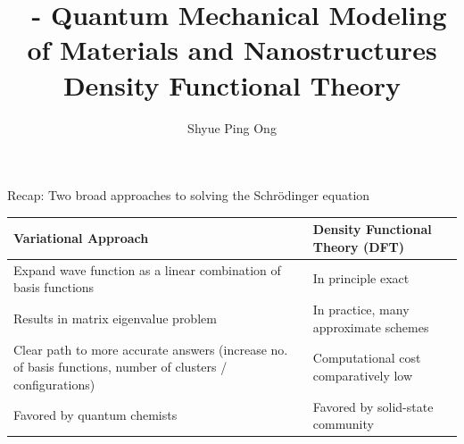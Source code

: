 \documentclass[aspectratio=169]{beamer}
\title[\classname Density Functional Theory]{\classname~- Quantum Mechanical Modeling of Materials and Nanostructures\\Density Functional Theory}
\author{Shyue Ping Ong}
\institute[UCSD]{University of California, San Diego\\
\medskip
}
\date{\classyear} %
\begin{document}
\begin{frame}
    \titlepage %
\end{frame}

\begin{frame}{Recap: Two broad approaches to solving the Schr\"odinger equation}

\begin{table}[]
    \centering
    \begin{tabular}{p{7cm}|p{7cm}}
        \textbf{Variational Approach} & \textbf{Density Functional Theory (DFT)}  \\
        \hline\hline
        Expand wave function as a linear combination of basis functions & In principle exact\\
        \hline
        Results in matrix eigenvalue problem & In practice, many approximate schemes\\
        \hline
        Clear path to more accurate answers (increase no. of basis functions, number of clusters / configurations) & Computational cost comparatively low\\
        \hline
        Favored by quantum chemists & Favored by solid-state community\\
    \end{tabular}
\end{table}
    
\end{frame}
\end{document}
